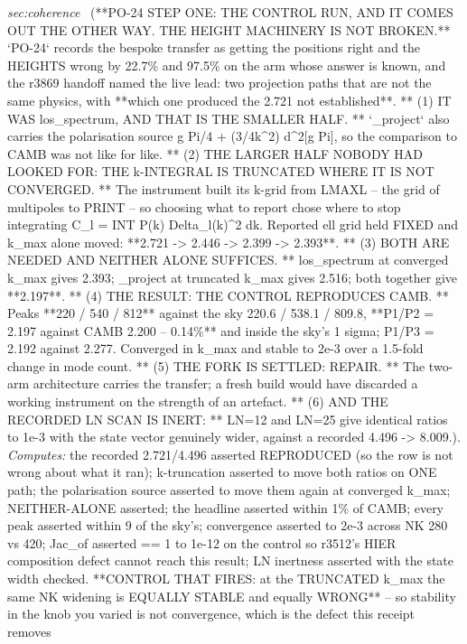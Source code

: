 \begin{description}
\textit{sec:coherence} \ (**PO-24 STEP ONE: THE CONTROL RUN, AND IT COMES OUT THE OTHER WAY. THE HEIGHT MACHINERY IS NOT BROKEN.** `PO-24` records the bespoke transfer as getting the positions right and the HEIGHTS wrong by 22.7\% and 97.5\% on the arm whose answer is known, and the r3869 handoff named the live lead: two projection paths that are not the same physics, with **which one produced the 2.721 not established**. ** (1) IT WAS los\_spectrum, AND THAT IS THE SMALLER HALF. ** `\_project` also carries the polarisation source g Pi/4 + (3/4k\textasciicircum{}2) d\textasciicircum{}2[g Pi], so the comparison to CAMB was not like for like. ** (2) THE LARGER HALF NOBODY HAD LOOKED FOR: THE k-INTEGRAL IS TRUNCATED WHERE IT IS NOT CONVERGED. ** The instrument built its k-grid from LMAXL -- the grid of multipoles to PRINT -- so choosing what to report chose where to stop integrating C\_l = INT P(k) Delta\_l(k)\textasciicircum{}2 dk. Reported ell grid held FIXED and k\_max alone moved: **2.721 -> 2.446 -> 2.399 -> 2.393**. ** (3) BOTH ARE NEEDED AND NEITHER ALONE SUFFICES. ** los\_spectrum at converged k\_max gives 2.393; \_project at truncated k\_max gives 2.516; both together give **2.197**. ** (4) THE RESULT: THE CONTROL REPRODUCES CAMB. ** Peaks **220 / 540 / 812** against the sky 220.6 / 538.1 / 809.8, **P1/P2 = 2.197 against CAMB 2.200 -- 0.14\%** and inside the sky's 1 sigma; P1/P3 = 2.192 against 2.277. Converged in k\_max and stable to 2e-3 over a 1.5-fold change in mode count. ** (5) THE FORK IS SETTLED: REPAIR. ** The two-arm architecture carries the transfer; a fresh build would have discarded a working instrument on the strength of an artefact. ** (6) AND THE RECORDED LN SCAN IS INERT: ** LN=12 and LN=25 give identical ratios to 1e-3 with the state vector genuinely wider, against a recorded 4.496 -> 8.009.). 
\emph{Computes:} the recorded 2.721/4.496 asserted REPRODUCED (so the row is not wrong about what it ran); k-truncation asserted to move both ratios on ONE path; the polarisation source asserted to move them again at converged k\_max; NEITHER-ALONE asserted; the headline asserted within 1\% of CAMB; every peak asserted within 9 of the sky's; convergence asserted to 2e-3 across NK 280 vs 420; Jac\_of asserted == 1 to 1e-12 on the control so r3512's HIER composition defect cannot reach this result; LN inertness asserted with the state width checked. **CONTROL THAT FIRES: at the TRUNCATED k\_max the same NK widening is EQUALLY STABLE and equally WRONG** -- so stability in the knob you varied is not convergence, which is the defect this receipt removes

\end{description}
